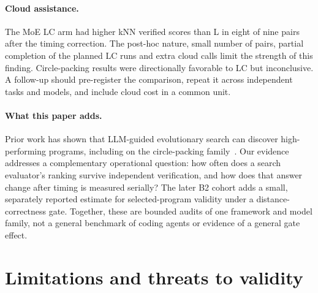 \documentclass[11pt]{article}
\begin{document}
\paragraph{Cloud assistance.} The MoE LC arm had higher kNN verified scores than L in eight of nine pairs after the timing correction. The post-hoc nature, small number of pairs, partial completion of the planned LC runs and extra cloud calls limit the strength of this finding. Circle-packing results were directionally favorable to LC but inconclusive. A follow-up should pre-register the comparison, repeat it across independent tasks and models, and include cloud cost in a common unit.

\paragraph{What this paper adds.} Prior work has shown that LLM-guided evolutionary search can discover high-performing programs, including on the circle-packing family~\citep{romera2024funsearch,novikov2025alphaevolve,assumpcao2025codeevolve}. Our evidence addresses a complementary operational question: how often does a search evaluator's ranking survive independent verification, and how does that answer change after timing is measured serially? The later B2 cohort adds a small, separately reported estimate for selected-program validity under a distance-correctness gate. Together, these are bounded audits of one framework and model family, not a general benchmark of coding agents or evidence of a general gate effect.

\section{Limitations and threats to validity}\label{sec:limitations}
\end{document}
